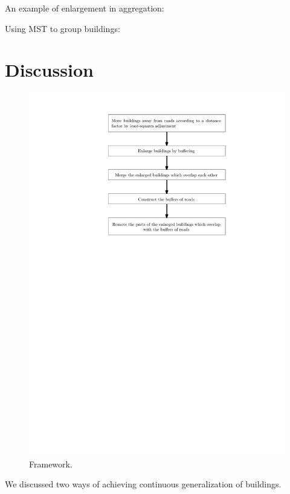 \documentclass[graybox]{svmult}
\begin{document}
 \parencite{Damen2008}

An example of enlargement in aggregation: 

Using MST to group buildings: \textcite{Zhang2013, 
Cetinkaya2015,Deng2017,Regnauld1996}



\section{Discussion}
\label{sec:Discussion}

\begin{figure}[tb]
	\centering
	\includegraphics{Framework}
	\caption{Framework.}
	\label{fig:Framework}
\end{figure}



We discussed two ways of achieving continuous generalization of 
buildings. 
\end{document}
